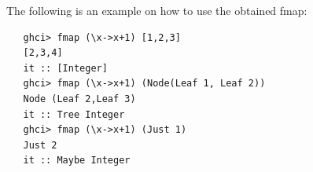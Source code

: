 
The following is an example on how to use the obtained fmap:
\begin{lstlisting}
   ghci> fmap (\x->x+1) [1,2,3]
   [2,3,4]
   it :: [Integer]
   ghci> fmap (\x->x+1) (Node(Leaf 1, Leaf 2))
   Node (Leaf 2,Leaf 3)
   it :: Tree Integer
   ghci> fmap (\x->x+1) (Just 1)
   Just 2
   it :: Maybe Integer
\end{lstlisting}